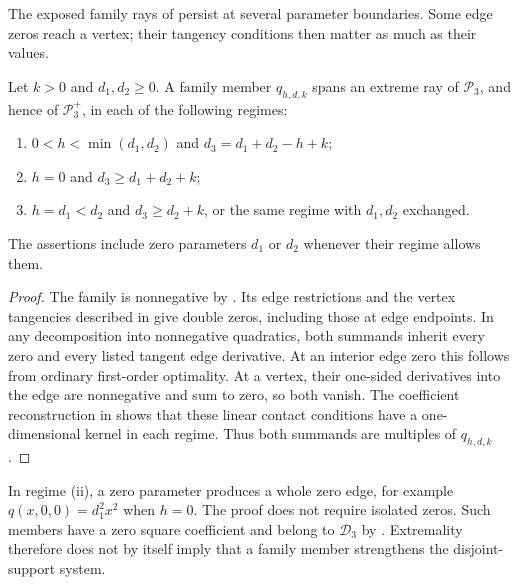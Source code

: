 The exposed family rays of  persist at several
parameter boundaries. Some edge zeros reach a vertex; their tangency
conditions then matter as much as their values.

\begin{theorem}\label{three:boundary}
Let $k>0$ and $d_1,d_2\ge0$. A family member
$q_{h,d,k}$ spans an extreme ray of $\mathcal P_3$, and hence of
$\mathcal P_3^+$, in each of the following regimes:
\begin{enumerate}[label=(\roman*)]
\item $0<h<\min(d_1,d_2)$ and $d_3=d_1+d_2-h+k$;
\item $h=0$ and $d_3\ge d_1+d_2+k$;
\item $h=d_1<d_2$ and $d_3\ge d_2+k$, or the same regime with
      $d_1,d_2$ exchanged.
\end{enumerate}
The assertions include zero parameters $d_1$ or $d_2$ whenever their
regime allows them.
\end{theorem}
\begin{proof}
The family is nonnegative by . Its edge restrictions
and the vertex tangencies described in  give
double zeros, including those at edge endpoints. In any decomposition
into nonnegative quadratics, both summands inherit every zero and every
listed tangent edge derivative. At an interior edge zero this follows
from ordinary first-order optimality. At a vertex, their one-sided
derivatives into the edge are nonnegative and sum to zero, so both vanish.
The coefficient reconstruction in  shows that
these linear contact conditions have a one-dimensional kernel in each
regime. Thus both summands are multiples of $q_{h,d,k}$.
\end{proof}

In regime (ii), a zero parameter produces a whole zero edge, for example
$q(x,0,0)=d_1^2x^2$ when $h=0$. The proof does not require isolated zeros.
Such members have a zero square coefficient and belong to $\mathcal D_3$ by
. Extremality therefore does not by itself
imply that a family member strengthens the disjoint-support system.
